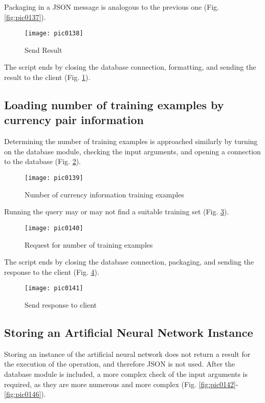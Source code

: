 Packaging in a JSON message is analogous to the previous one (Fig. \ref{fig:pic0137}).

\begin{figure}[h]
\centering
\texttt{[image: pic0138]}
\caption{Send Result}
\label{fig:pic0138}
\end{figure}
\FloatBarrier

The script ends by closing the database connection, formatting, and sending the result to the client (Fig. \ref{fig:pic0138}).

\subsection{Loading number of training examples by currency pair information}

Determining the number of training examples is approached similarly by turning on the database module, checking the input arguments, and opening a connection to the database (Fig. \ref{fig:pic0139}).

\begin{figure}[h]
\centering
\texttt{[image: pic0139]}
\caption{Number of currency information training examples}
\label{fig:pic0139}
\end{figure}
\FloatBarrier

Running the query may or may not find a suitable training set (Fig. \ref{fig:pic0140}).

\begin{figure}[h]
\centering
\texttt{[image: pic0140]}
\caption{Request for number of training examples}
\label{fig:pic0140}
\end{figure}
\FloatBarrier

The script ends by closing the database connection, packaging, and sending the response to the client (Fig. \ref{fig:pic0141}).

\begin{figure}[h]
\centering
\texttt{[image: pic0141]}
\caption{Send response to client}
\label{fig:pic0141}
\end{figure}
\FloatBarrier

\subsection{Storing an Artificial Neural Network Instance}

Storing an instance of the artificial neural network does not return a result for the execution of the operation, and therefore JSON is not used. After the database module is included, a more complex check of the input arguments is required, as they are more numerous and more complex (Fig. \ref{fig:pic0142}-\ref{fig:pic0146}).

